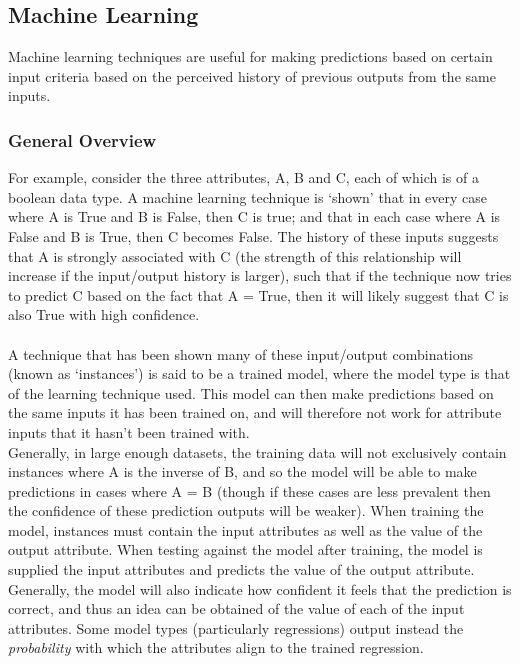 \subsection{Machine Learning}
Machine learning techniques are useful for making predictions based on certain input criteria based on the perceived history of previous outputs from the same inputs. 

\subsubsection{General Overview}
For example, consider the three attributes, A, B and C, each of which is of a boolean data type. A machine learning technique is `shown' that in every case where A is True and B is False, then C is true; and that in each case where A is False and B is True, then C becomes False. The history of these inputs suggests that A is strongly associated with C (the strength of this relationship will increase if the input/output history is larger), such that if the technique now tries to predict C based on the fact that A = True, then it will likely suggest that C is also True with high confidence.
\\ \\
A technique that has been shown many of these input/output combinations (known as `instances') is said to be a trained model, where the model type is that of the learning technique used. This model can then make predictions based on the same inputs it has been trained on, and will therefore not work for attribute inputs that it hasn't been trained with.
\\
Generally, in large enough datasets, the training data will not exclusively contain instances where A is the inverse of B, and so the model will be able to make predictions in cases where A = B (though if these cases are less prevalent then the confidence of these prediction outputs will be weaker). When training the model, instances must contain the input attributes as well as the value of the output attribute. When testing against the model after training, the model is supplied the input attributes and predicts the value of the output attribute. Generally, the model will also indicate how confident it feels that the prediction is correct, and thus an idea can be obtained of the value of each of the input attributes. Some model types (particularly regressions) output instead the \emph{probability} with which the attributes align to the trained regression.
\\ \\
